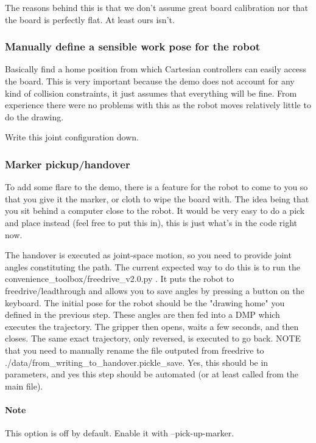 \documentclass{article}
\begin{document}
The reasons behind this is that we don't assume great board calibration nor that the board is perfectly flat.
At least ours isn't.

\subsubsection{Manually define a sensible work pose for the robot}
Basically find a home position from which Cartesian controllers can easily
access the board. This is very important because the demo does not
account for any kind of collision constraints, it just assumes
that everything will be fine. From experience there were no problems
with this as the robot moves relatively little to do the drawing.

Write this joint configuration down.

\subsubsection{Marker pickup/handover}
To add some flare to the demo, 
there is a feature for the robot to come to you so that you give it the marker,
or cloth to wipe the board with.
The idea being that you sit behind a computer close to the robot. It would be
very easy to do a pick and place instead (feel free to put this in),
this is just what's in the code right now.

The handover is executed as joint-space motion, so you need to provide 
joint angles constituting the path.
The current expected way to do this is to 
run the convenience\_toolbox/freedrive\_v2.0.py .
It puts the robot to freedrive/leadthrough and allows you to save 
angles by pressing a button on the keyboard.
The initial pose for the robot should be the "drawing home" you defined in the previous step.
These angles are then fed into a DMP which executes the trajectory.
The gripper then opens, waits a few seconds, and then closes.
The same exact trajectory, only reversed, is executed to go back.
NOTE that you need to manually rename the file outputed from freedrive
to ./data/from\_writing\_to\_handover.pickle\_save. Yes, 
this should be in parameters, and yes this step should be automated
(or at least called from the main file).

\paragraph{Note} This option is off by default. Enable it with --pick-up-marker.
\end{document}
